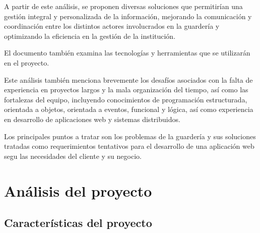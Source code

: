 \documentclass{article}
\begin{document}
A partir de este análisis, se proponen diversas soluciones que permitirían una gestión integral y personalizada de la información, mejorando la comunicación y coordinación entre los distintos actores involucrados en la guardería y optimizando la eficiencia en la gestión de la institución.

El documento también examina las tecnologías y herramientas que se utilizarán en el proyecto.

Este análisis también menciona brevemente los desafíos asociados con la falta de experiencia en proyectos largos y la mala organización del tiempo, así como las fortalezas del equipo, incluyendo conocimientos de programación estructurada, orientada a objetos, orientada a eventos, funcional y lógica, así como experiencia en desarrollo de aplicaciones web y sistemas distribuidos.

Los principales puntos a tratar son los problemas de la guardería y sus soluciones tratadas como requerimientos tentativos para el desarrollo de una aplicación web segu las necesidades del cliente y su negocio.

\section{Análisis del proyecto}
\subsection{Características del proyecto}
\end{document}
